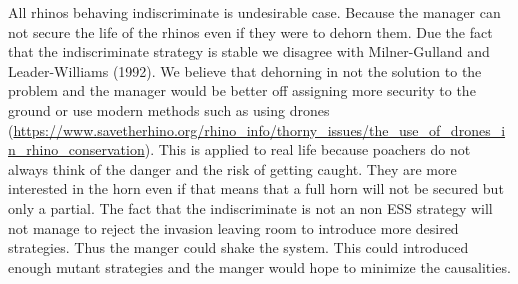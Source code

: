 \documentclass[10pt]{article}
\begin{document}
All rhinos behaving indiscriminate is undesirable case. Because the manager can
not secure the life of the rhinos even if they were to dehorn them. Due the fact 
that the indiscriminate strategy is stable we disagree with Milner-Gulland and
Leader-Williams (1992). We believe that dehorning in not the 
solution to the problem and the manager would be better off assigning more 
security to the ground or use modern methods such as using drones
(\url{https://www.savetherhino.org/rhino_info/thorny_issues/the_use_of_drones_in_rhino_conservation}).
This is applied to real life because poachers 
do not always think of the danger and the risk of getting caught.
They are more interested in the horn even if that means that a full horn will
not be secured but only a partial. The fact that the indiscriminate is not
an non ESS strategy will not manage to reject the invasion leaving
room to introduce more desired strategies.
Thus the manger could shake  the system. This
could introduced enough mutant strategies and the manger would
hope to minimize the causalities.



\end{document}
